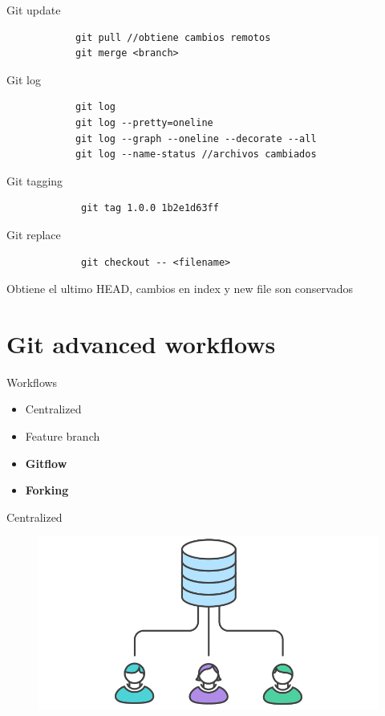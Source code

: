 \documentclass{beamer}
\begin{document}
\begin{frame}[fragile]{Git update}	
	\begin{verbatim}
			git pull //obtiene cambios remotos
			git merge <branch>
	\end{verbatim}
\end{frame}

\begin{frame}[fragile]{Git log}	
	\begin{verbatim}
			git log
			git log --pretty=oneline
			git log --graph --oneline --decorate --all
			git log --name-status //archivos cambiados
	\end{verbatim}
\end{frame}

\begin{frame}[fragile]{Git tagging}	
	\begin{verbatim}
			 git tag 1.0.0 1b2e1d63ff
	\end{verbatim}
\end{frame}

\begin{frame}[fragile]{Git replace}	
	\begin{verbatim}
			 git checkout -- <filename>
	\end{verbatim}
	Obtiene el ultimo HEAD, cambios en index y new file son conservados
\end{frame}

\section{Git advanced workflows}

\begin{frame}{Workflows}
	\begin{itemize}
		\item Centralized
		\item Feature branch
		\item \textbf{Gitflow}
		\item \textbf{Forking}
	\end{itemize}
\end{frame}


\begin{frame}{Centralized}
\begin{figure}
\centering
\includegraphics[width=0.7\linewidth]{Images/centralized}
\end{figure}
\end{frame}
\end{document}
